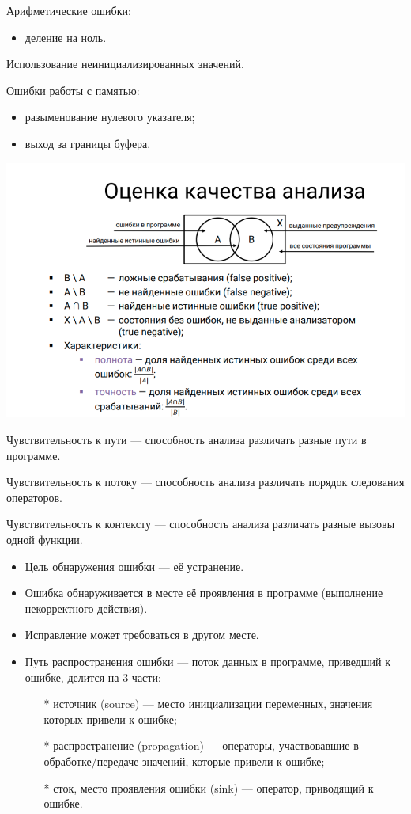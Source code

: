 Арифметические ошибки:
\begin{itemize}
    \item деление на ноль.
\end{itemize}

Использование неинициализированных значений.

Ошибки работы с памятью:
\begin{itemize}
    \item разыменование нулевого указателя;
    \item выход за границы буфера.
\end{itemize}

\includegraphics[width=\linewidth]{pics/quality_check.png}

Чувствительность к пути — способность анализа различать разные пути в программе.

Чувствительность к потоку — способность анализа различать порядок следования операторов.

Чувствительность к контексту — способность анализа различать разные вызовы одной функции.

\begin{itemize}
    \item Цель обнаружения ошибки — её устранение.
    \item Ошибка обнаруживается в месте её проявления в программе (выполнение некорректного действия).
    \item Исправление может требоваться в другом месте.
    \item Путь распространения ошибки — поток данных в программе, приведший к ошибке, делится на 3 части:
    \begin{itemize}
        \item[*] источник (source) — место инициализации переменных, значения которых привели к ошибке;
        \item[*] распространение (propagation) — операторы, участвовавшие в обработке/передаче значений, которые привели к ошибке;
        \item[*] сток, место проявления ошибки (sink) — оператор, приводящий к ошибке.
    \end{itemize}
\end{itemize}
